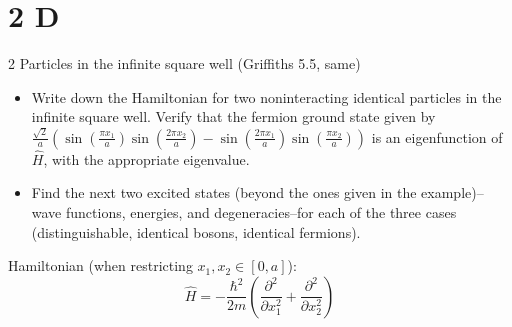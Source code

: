 \documentclass{article}
\begin{document}
\section*{2 D}
\begin{ques}
2 Particles in the infinite square well (Griffiths 5.5, same)

\begin{itemize}
    \item[(a)] Write down the Hamiltonian for two noninteracting identical particles in the infinite square well. Verify that the fermion ground state given by $\frac{\sqrt{2}}{a}\left(\sin\left(\frac{\pi x_1}{a}\right)\sin\left(\frac{2\pi x_2}{a}\right)-\sin\left(\frac{2\pi x_1}{a}\right)\sin\left(\frac{\pi x_2}{a}\right)\right)$ is an eigenfunction of $\hat{H}$, with the appropriate eigenvalue.
    \item[(b)] Find the next two excited states (beyond the ones given in the example)--wave functions, energies, and degeneracies--for each of the three cases (distinguishable, identical bosons, identical fermions).
\end{itemize}
Hamiltonian (when restricting $x_1,x_2\in[0,a]$):
$$\hat{H} = -\frac{\hbar^2}{2m}\left(\frac{\partial^2}{\partial x_1^2}+\frac{\partial^2}{\partial x_2^2}\right)$$
\end{ques}
\end{document}
